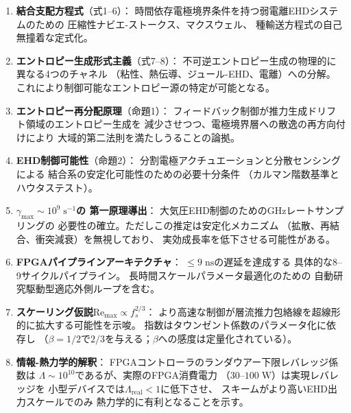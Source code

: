 \documentclass[12pt,twocolumn]{ltjsarticle}
\begin{document}
\begin{enumerate}
  \item \textbf{結合支配方程式}（式1--6）：
    時間依存電極境界条件を持つ弱電離EHDシステムのための
    圧縮性ナビエ-ストークス、マクスウェル、
    種輸送方程式の自己無撞着な定式化。

  \item \textbf{エントロピー生成形式主義}（式7--8）：
    不可逆エントロピー生成の物理的に異なる4つのチャネル
    （粘性、熱伝導、ジュール-EHD、電離）への分解。
    これにより制御可能なエントロピー源の特定が可能となる。

  \item \textbf{エントロピー再分配原理}（命題1）：
    フィードバック制御が推力生成ドリフト領域のエントロピー生成を
    減少させつつ、電極境界層への散逸の再方向付けにより
    大域的第二法則を満たしうることの論拠。

  \item \textbf{EHD制御可能性}（命題2）：
    分割電極アクチュエーションと分散センシングによる
    結合系の安定化可能性のための必要十分条件
    （カルマン階数基準とハウタステスト）。

  \item \textbf{$\gamma_{\max} \sim 10^9\;\mathrm{s^{-1}}$の
    第一原理導出}：
    大気圧EHD制御のためのGHzレートサンプリングの
    必要性の確立。ただしこの推定は安定化メカニズム
    （拡散、再結合、衝突減衰）を無視しており、
    実効成長率を低下させる可能性がある。

  \item \textbf{FPGAパイプラインアーキテクチャ}：
    $\leq 9\;\mathrm{ns}$の遅延を達成する
    具体的な8--9サイクルパイプライン。
    長時間スケールパラメータ最適化のための
    自動研究駆動型適応外側ループを含む。

  \item \textbf{スケーリング仮説$\mathrm{Re}_{\max} \propto
    f_s^{2/3}$}：
    より高速な制御が層流推力包絡線を超線形的に拡大する可能性を示唆。
    指数はタウンゼント係数のパラメータ化に依存し
    （$\beta = 1/2$で$2/3$を与える；$\beta$への感度は定量化されている）。

  \item \textbf{情報-熱力学的解釈}：
    FPGAコントローラのランダウアー下限レバレッジ係数は
    $\Lambda \sim 10^{10}$であるが、実際のFPGA消費電力
    （$30$--$100\;\mathrm{W}$）は実現レバレッジを
    小型デバイスでは$\Lambda_{\mathrm{real}} < 1$に低下させ、
    スキームがより高いEHD出力スケールでのみ
    熱力学的に有利となることを示す。
\end{enumerate}
\end{document}
